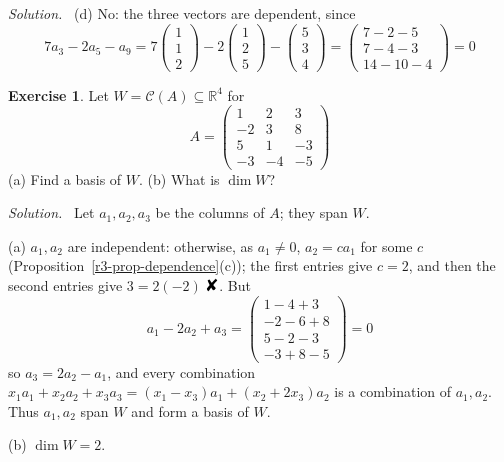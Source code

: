 \documentclass[12pt]{article}
\newcommand{\R}{\mathbb R}
\newcommand{\contradiction}{\mathord{\text{\large\ding{56}}}}
\theoremstyle{definition}
\newtheorem{exercise}{Exercise}
\newenvironment{solution}{\par\noindent\textit{Solution.}\ }{\par\smallskip}
\begin{document}
\begin{solution}
(d) No: the three vectors are dependent, since
\[
7a_3-2a_5-a_9=7\begin{pmatrix}1\\1\\2\end{pmatrix}-2\begin{pmatrix}1\\2\\5\end{pmatrix}-\begin{pmatrix}5\\3\\4\end{pmatrix}
=\begin{pmatrix}7-2-5\\7-4-3\\14-10-4\end{pmatrix}=0
\]
\end{solution}

\begin{exercise}\label{ex:r4-column-basis}
Let \(W=\mathcal C(A)\subseteq\R^4\) for
\[
A=\begin{pmatrix}1&2&3\\-2&3&8\\5&1&-3\\-3&-4&-5\end{pmatrix}
\]
(a) Find a basis of \(W\). (b) What is \(\dim W\)?
\end{exercise}
\begin{solution}
Let \(a_1,a_2,a_3\) be the columns of \(A\); they span \(W\).

(a) \(a_1,a_2\) are independent: otherwise, as \(a_1\ne0\), \(a_2=ca_1\) for some \(c\)
(Proposition~\ref{r3-prop-dependence}(c)); the first entries give \(c=2\), and then the second entries give \(3=2(-2)\)
\(\contradiction\). But
\[
a_1-2a_2+a_3=\begin{pmatrix}1-4+3\\-2-6+8\\5-2-3\\-3+8-5\end{pmatrix}=0
\]
so \(a_3=2a_2-a_1\), and every combination \(x_1a_1+x_2a_2+x_3a_3=(x_1-x_3)a_1+(x_2+2x_3)a_2\) is a
combination of \(a_1,a_2\). Thus \(a_1,a_2\) span \(W\) and form a basis of \(W\).

(b) \(\dim W=2\).
\end{solution}
\end{document}
